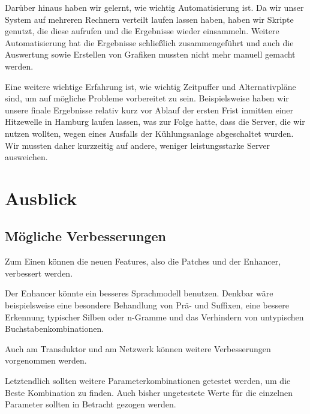\documentclass[a4paper]{article}
\begin{document}
Darüber hinaus haben wir gelernt, wie wichtig Automatisierung ist. Da wir unser System auf mehreren Rechnern verteilt laufen lassen haben, haben wir Skripte genutzt, die diese aufrufen und die Ergebnisse wieder einsammeln. Weitere Automatisierung hat die Ergebnisse schließlich zusammengeführt und auch die Auswertung sowie Erstellen von Grafiken mussten nicht mehr manuell gemacht werden.

Eine weitere wichtige Erfahrung ist, wie wichtig Zeitpuffer und Alternativpläne sind, um auf mögliche Probleme vorbereitet zu sein. Beispielsweise haben wir unsere finale Ergebnisse relativ kurz vor Ablauf der ersten Frist inmitten einer Hitzewelle in Hamburg laufen lassen, was zur Folge hatte, dass die Server, die wir nutzen wollten, wegen eines Ausfalls der Kühlungsanlage abgeschaltet wurden. Wir mussten daher kurzzeitig auf andere, weniger leistungsstarke Server ausweichen.
    
\section{Ausblick}
\label{sec:future_work}
\subsection{Mögliche Verbesserungen}

Zum Einen können die neuen Features, also die Patches und der Enhancer, verbessert werden.

Der Enhancer könnte ein besseres Sprachmodell benutzen. Denkbar wäre beispielsweise eine besondere Behandlung von Prä- und Suffixen, eine  bessere Erkennung typischer Silben oder n-Gramme und das Verhindern von untypischen Buchstabenkombinationen.

Auch am Transduktor und am Netzwerk können weitere Verbesserungen vorgenommen werden.

Letztendlich sollten weitere Parameterkombinationen getestet werden, um die Beste Kombination zu finden. Auch bisher ungetestete Werte für die einzelnen Parameter sollten in Betracht gezogen werden.
\end{document}
